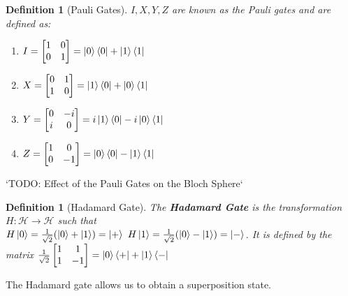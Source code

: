 \documentclass[12pt,twoside]{report}
\newtheorem{defn}[subsection]{Definition}
\begin{document}
\begin{defn}[Pauli Gates]
    $I, X, Y, Z$ are known as the Pauli gates and are defined as: 
    \begin{enumerate}
        \item $I = \begin{bmatrix} 1 & 0 \\ 0 & 1 \end{bmatrix} = \ket{0}\bra{0} + \ket{1}\bra{1}$
        \item $X = \begin{bmatrix} 0 & 1 \\ 1 & 0 \end{bmatrix} = \ket{1}\bra{0} + \ket{0}\bra{1}$
        \item $Y = \begin{bmatrix} 0 & -i \\ i & 0 \end{bmatrix} = i \ket{1}\bra{0} - i \ket{0}\bra{1}$
        \item $Z = \begin{bmatrix} 1 & 0 \\ 0 & -1 \end{bmatrix} = \ket{0}\bra{0} - \ket{1}\bra{1}$
    \end{enumerate}
\end{defn}

`TODO: Effect of the Pauli Gates on the Bloch Sphere`

\begin{defn}[Hadamard Gate]
    The \textbf{Hadamard Gate} is the transformation $H: \mathcal{H} \to \mathcal{H}$ such that \\
    $H \ket{0} = \frac{1}{\sqrt{2}} (\ket{0} + \ket{1}) = \ket{+}$ 
    $H \ket{1} = \frac{1}{\sqrt{2}} (\ket{0} - \ket{1}) = \ket{-}$.  It is defined by the matrix 
    $\frac{1}{\sqrt{2}} \begin{bmatrix} 1 & 1 \\ 1 & -1 \end{bmatrix} = \ket{0}\bra{+} + \ket{1}\bra{-}$
\end{defn}
The Hadamard gate allows us to obtain a superposition state.
\end{document}
